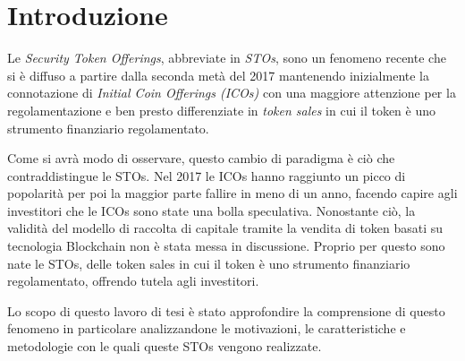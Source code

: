 \chapter*{Introduzione}                 %

Le \textit{Security Token Offerings}, abbreviate in \textit{STOs}, sono un fenomeno recente che si è diffuso a partire dalla seconda metà del 2017 mantenendo inizialmente la connotazione di \textit{Initial Coin Offerings (ICOs)} con una maggiore attenzione per la regolamentazione e ben presto differenziate in \textit{token sales} in cui il token è uno strumento finanziario regolamentato. 

Come si avrà modo di osservare, questo cambio di paradigma è ciò che contraddistingue le STOs. Nel 2017 le ICOs hanno raggiunto un picco di popolarità per poi la maggior parte fallire in meno di un anno, facendo capire agli investitori che le ICOs sono state una bolla speculativa. Nonostante ciò, la validità del modello di raccolta di capitale tramite la vendita di token basati su tecnologia Blockchain non è stata messa in discussione. Proprio per questo sono nate le STOs, delle token sales in cui il token è uno strumento finanziario regolamentato, offrendo tutela agli investitori. 

Lo scopo di questo lavoro di tesi è stato approfondire la comprensione di questo fenomeno in particolare analizzandone le motivazioni, le caratteristiche e metodologie con le quali queste STOs vengono realizzate.

